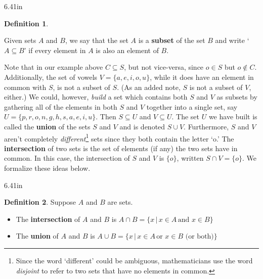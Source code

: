 \documentclass[11pt]{article}
\theoremstyle{definition}  %
\newtheorem{defn}{\bf Definition}
\newcommand{\bbm}{\begin{boxedminipage}{6.41in}}
\newcommand{\ebm}{\end{boxedminipage}}
\begin{document}
\medskip

\colorbox{ResultColor}{\bbm

\begin{defn} \label{subsetdef}

Given sets $A$ and $B$, we say that the set $A$ is a \textbf{subset} of the set $B$ and write `$A \subseteq B$' if every element in $A$ is also an element of $B$.  

\end{defn}

\ebm}

\medskip

Note that in our example above $C \subseteq S$, but not vice-versa, since $o \in S$ but $o \notin C$.  Additionally, the set of vowels $V = \{ a, e, i, o, u\}$, while it does have an element in common with $S$, is not a subset of $S$. (As an added note,  $S$ is not a subset of $V$, either.)  We could, however, \textit{build} a set which contains both $S$ and $V$ as subsets by gathering all of the elements in both $S$ and $V$ together into a single set, say $U = \{ p, r, o, n, g, h, s, a, e, i, u\}$.   Then $S \subseteq U$ and $V \subseteq U$.  The set $U$ we have built is called the \textbf{union} of the sets $S$ and $V$ and is denoted $S \cup V$.    Furthermore, $S$ and $V$ aren't completely \textit{different}\footnote{Since the word `different' could be ambiguous, mathematicians use the word \textit{disjoint} to refer to two sets that have no elements in common.} sets since they both contain the letter `o.'  The \textbf{intersection} of two sets is the set of elements (if any) the two sets have in common. In this case, the intersection of $S$ and $V$ is $\{ o\}$, written $S \cap V = \{ o \}$.  We formalize these ideas below.

\medskip

\colorbox{ResultColor}{\bbm

\begin{defn} \label{intersectionunion}  Suppose $A$ and $B$ are sets.

\begin{itemize}

\item The \textbf{intersection} of $A$ and $B$ is $A \cap B = \{ x \, | \, x \in A \, \text{and} \,\, x \in B \}$

\item The \textbf{union} of $A$ and $B$ is $A \cup B = \{ x \, | \, x \in A \, \text{or} \,\, x \in B \, \, \text{(or both)} \}$

\end{itemize}

\end{defn}

\ebm}
\end{document}
